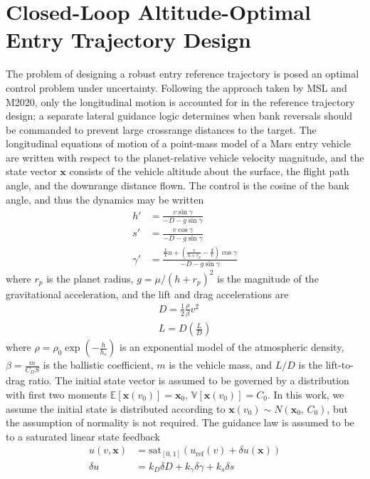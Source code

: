 \documentclass[journal ]{new-aiaa}
\newcommand{\state}{\ensuremath{\mathbf{x}}}
\newcommand{\ur}{\ensuremath{u_{\mathrm{ref}}}}
\newcommand{\E}[1]{\mathbb{E}\left[#1\right]}
\newcommand{\V}[1]{\mathbb{V}[#1]}
\newcommand{\cov}{C}
\begin{document}
\section*{Closed-Loop Altitude-Optimal Entry Trajectory Design}
The problem of designing a robust entry reference trajectory is posed an optimal control problem under uncertainty. Following the approach taken by MSL and M2020, only the longitudinal motion is accounted for in the reference trajectory design; a separate lateral guidance logic determines when bank reversals should be commanded to prevent large crossrange distances to the target.
The longitudinal equations of motion of a point-mass model of a Mars entry vehicle are written with respect to the planet-relative vehicle velocity magnitude, and the state vector $\state$ consists of the vehicle altitude about the surface, the flight path angle, and the downrange distance flown. The control is the cosine of the bank angle, and thus the dynamics may be written
\begin{align}
h' &= \frac{v\sin\gamma}{-D - g\sin\gamma} \label{eq_dynamics_altitude}\\
s' &= \frac{v\cos\gamma}{-D - g\sin\gamma} \\
\gamma' &= \frac{\frac{L}{V}u + \left(\frac{v}{h+r_p}-\frac{g}{v}\right)\cos\gamma}{-D - g\sin\gamma} \label{eq_dynamics_fpa}
\end{align}
where $r_p$ is the planet radius, $g=\mu/(h+r_p)^2$ is the magnitude of the gravitational acceleration, and the lift and drag accelerations are
\begin{align}
D = \frac{1}{2}\frac{\rho}{\beta} v^2 \\
L = D(\frac{L}{D})
\end{align}
where $\rho=\rho_0\exp\left(-\frac{h}{h_s}\right)$ is an exponential model of the atmospheric density, $\beta=\frac{m}{C_DS}$ is the ballistic coefficient, $m$ is the vehicle mass, and $L/D$ is the lift-to-drag ratio.
The initial state vector is assumed to be governed by a distribution with first two moments $\E{\state(v_0)} = \state_0$, $\V{\state(v_0)} = \cov_0$. In this work, we assume the initial state is distributed according to $\state(v_0)\sim N(\state_0,\,\cov_0)$, but the assumption of normality is not required.
The guidance law is assumed to be to a saturated linear state feedback 
\begin{align}
u(v,\state) &= \mathrm{sat}_{[0,1]}\left(\ur(v) + \delta u(\state)\right)\\
\delta u &= k_D\delta D + k_{\gamma}\delta\gamma + k_s\delta s
\end{align}
\end{document}
